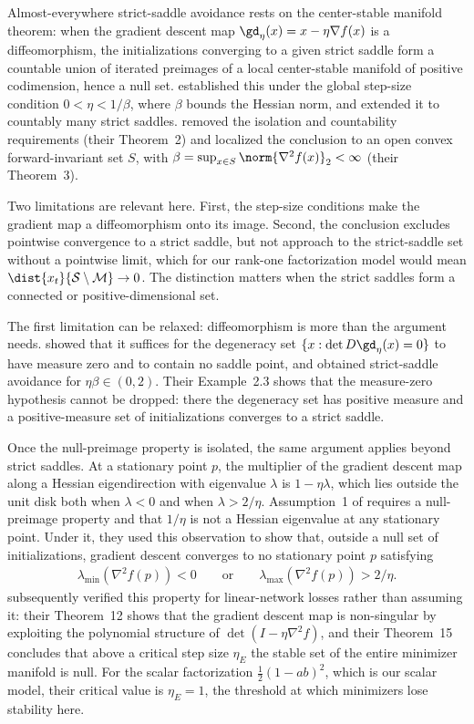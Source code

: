 \documentclass{article}
\begin{document}
Almost-everywhere strict-saddle avoidance rests on the center-stable manifold
theorem: when the gradient descent map $\gd_\eta(x)=x-\eta\nabla f(x)$ is a
diffeomorphism, the initializations converging to a given strict saddle form a
countable union of iterated preimages of a local center-stable manifold of
positive codimension, hence a null set. \citet{lee2016gradient} established this
under the global step-size condition $0<\eta<1/\beta$, where $\beta$ bounds the
Hessian norm, and extended it to countably many strict saddles.
\citet{panageas2017gradient} removed the isolation and countability requirements
(their Theorem~2) and localized the conclusion to an open convex
forward-invariant set $S$, with
$\beta=\sup_{x\in S}\norm{\nabla^2 f(x)}_2<\infty$ (their Theorem~3).

Two limitations are relevant here. First, the step-size conditions make the
gradient map a diffeomorphism onto its image. Second, the conclusion excludes
pointwise convergence to a strict saddle, but not approach to the strict-saddle
set without a pointwise limit, which for our rank-one factorization model would
mean $\dist{x_t}{\mathcal S\setminus\mathcal M}\to0$. The distinction matters
when the strict saddles form a connected or positive-dimensional set.

The first limitation can be relaxed: diffeomorphism is more than the argument
needs. \citet{schaeffer2020extending} showed that it suffices for the degeneracy
set $\{x : \det D\gd_\eta(x)=0\}$ to have measure zero and to contain no saddle
point, and obtained strict-saddle avoidance for $\eta\beta\in(0,2)$. Their
Example~2.3 shows that the measure-zero hypothesis cannot be dropped: there the
degeneracy set has positive measure and a positive-measure set of
initializations converges to a strict saddle.

Once the null-preimage property is isolated, the same argument applies beyond
strict saddles. At a stationary point $p$, the multiplier of the gradient
descent map along a Hessian eigendirection with eigenvalue $\lambda$ is
$1-\eta\lambda$, which lies outside the unit disk both when $\lambda<0$ and when
$\lambda>2/\eta$. Assumption~1 of \citet{ahn2022understanding} requires a
null-preimage property and that $1/\eta$ is not a Hessian eigenvalue at any
stationary point. Under it, they used this observation to show that, outside a
null set of initializations, gradient descent converges to no stationary
point $p$ satisfying
\begin{align}
    \lambda_{\min}(\nabla^2 f(p))<0
    \qquad\text{or}\qquad
    \lambda_{\max}(\nabla^2 f(p))>2/\eta.
\end{align}
\citet{craciun2024convergence} subsequently verified this property for
linear-network losses rather than assuming it: their Theorem~12 shows that the
gradient descent map is non-singular by exploiting the polynomial structure of
$\det(I-\eta\nabla^2 f)$, and their Theorem~15 concludes that above a critical
step size $\eta_E$ the stable set of the entire minimizer manifold is null. For
the scalar factorization $\tfrac12(1-ab)^2$, which is our scalar model, their
critical value is $\eta_E=1$, the threshold at which minimizers lose stability
here.
\end{document}
